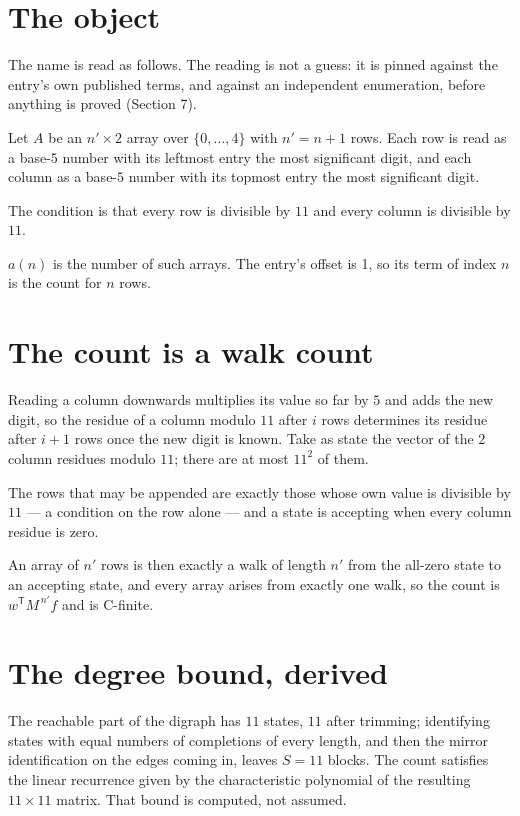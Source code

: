\documentclass[11pt]{article}
\theoremstyle{definition}
\begin{document}
\section{The object}

The name is read as follows. The reading is not a guess: it is pinned against the entry's own published terms, and against an independent enumeration, before anything is proved (Section 7).

Let $A$ be an $n' \times 2$ array over $\{0,\dots,4\}$ with $n' = n + 1$ rows. Each row is read as a base-$5$ number with its leftmost entry the most significant digit, and each column as a base-$5$ number with its topmost entry the most significant digit.

The condition is that every row is divisible by $11$ and every column is divisible by $11$.

$a(n)$ is the number of such arrays. The entry's offset is 1, so its term of index $n$ is the count for $n$ rows.

\section{The count is a walk count}

Reading a column downwards multiplies its value so far by $5$ and adds the new digit, so the residue of a column modulo $11$ after $i$ rows determines its residue after $i+1$ rows once the new digit is known. Take as state the vector of the $2$ column residues modulo $11$; there are at most $11^{2}$ of them.

The rows that may be appended are exactly those whose own value is divisible by $11$ --- a condition on the row alone --- and a state is accepting when every column residue is zero.

An array of $n'$ rows is then exactly a walk of length $n'$ from the all-zero state to an accepting state, and every array arises from exactly one walk, so the count is $w^{\mathsf T}M^{\,n'}f$ and is C-finite.

\section{The degree bound, derived}

The reachable part of the digraph has $11$ states, $11$ after trimming; identifying states with equal numbers of completions of every length, and then the mirror identification on the edges coming in, leaves $S = 11$ blocks. The count satisfies the linear recurrence given by the characteristic polynomial of the resulting $11\times11$ matrix. That bound is computed, not assumed.
\end{document}

